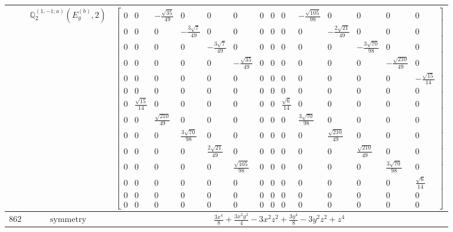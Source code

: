 \documentclass[fleqn,8pt,landscape]{jsarticle}
\begin{document}
\begin{longtable}{ccc}
$  $ & $ \mathbb{Q}_{2}^{(1,-1;a)}(E_{g}^{(b)},2) $ & $ \begin{bmatrix} 0 & 0 & - \frac{\sqrt{35}}{49} & 0 & 0 & 0 & 0 & 0 & 0 & - \frac{\sqrt{105}}{98} & 0 & 0 & 0 & 0 \\ 0 & 0 & 0 & - \frac{3 \sqrt{7}}{49} & 0 & 0 & 0 & 0 & 0 & 0 & - \frac{2 \sqrt{21}}{49} & 0 & 0 & 0 \\ 0 & 0 & 0 & 0 & - \frac{3 \sqrt{7}}{49} & 0 & 0 & 0 & 0 & 0 & 0 & - \frac{3 \sqrt{70}}{98} & 0 & 0 \\ 0 & 0 & 0 & 0 & 0 & - \frac{\sqrt{35}}{49} & 0 & 0 & 0 & 0 & 0 & 0 & - \frac{\sqrt{210}}{49} & 0 \\ 0 & 0 & 0 & 0 & 0 & 0 & 0 & 0 & 0 & 0 & 0 & 0 & 0 & - \frac{\sqrt{15}}{14} \\ 0 & 0 & 0 & 0 & 0 & 0 & 0 & 0 & 0 & 0 & 0 & 0 & 0 & 0 \\ 0 & \frac{\sqrt{15}}{14} & 0 & 0 & 0 & 0 & 0 & 0 & \frac{\sqrt{6}}{14} & 0 & 0 & 0 & 0 & 0 \\ 0 & 0 & \frac{\sqrt{210}}{49} & 0 & 0 & 0 & 0 & 0 & 0 & \frac{3 \sqrt{70}}{98} & 0 & 0 & 0 & 0 \\ 0 & 0 & 0 & \frac{3 \sqrt{70}}{98} & 0 & 0 & 0 & 0 & 0 & 0 & \frac{\sqrt{210}}{49} & 0 & 0 & 0 \\ 0 & 0 & 0 & 0 & \frac{2 \sqrt{21}}{49} & 0 & 0 & 0 & 0 & 0 & 0 & \frac{\sqrt{210}}{49} & 0 & 0 \\ 0 & 0 & 0 & 0 & 0 & \frac{\sqrt{105}}{98} & 0 & 0 & 0 & 0 & 0 & 0 & \frac{3 \sqrt{70}}{98} & 0 \\ 0 & 0 & 0 & 0 & 0 & 0 & 0 & 0 & 0 & 0 & 0 & 0 & 0 & \frac{\sqrt{6}}{14} \\ 0 & 0 & 0 & 0 & 0 & 0 & 0 & 0 & 0 & 0 & 0 & 0 & 0 & 0 \\ 0 & 0 & 0 & 0 & 0 & 0 & 0 & 0 & 0 & 0 & 0 & 0 & 0 & 0 \end{bmatrix} $ \\ \hline
$ 862 $ & $ \text{symmetry} $ & $ \frac{3 x^{4}}{8} + \frac{3 x^{2} y^{2}}{4} - 3 x^{2} z^{2} + \frac{3 y^{4}}{8} - 3 y^{2} z^{2} + z^{4} $ \\

\end{longtable}
\end{document}
